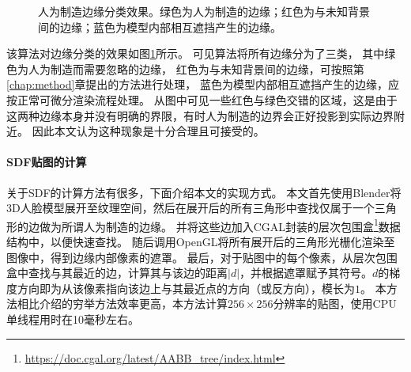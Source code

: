 \begin{figure}
\centering
{}
\caption[人为制造边缘分类效果]{人为制造边缘分类效果。绿色为人为制造的边缘；红色为与未知背景间的边缘；蓝色为模型内部相互遮挡产生的边缘。}
\label{fig:sdf_result}
\end{figure}

该算法对边缘分类的效果如图\ref{fig:sdf_result}所示。
可见算法将所有边缘分为了三类，
其中绿色为人为制造而需要忽略的边缘，
红色为与未知背景间的边缘，可按照第\ref{chap:method}章提出的方法进行处理，
蓝色为模型内部相互遮挡产生的边缘，应按正常可微分渲染流程处理。
从图中可见一些红色与绿色交错的区域，这是由于这两种边缘本身并没有明确的界限，有时人为制造的边界会正好投影到实际边界附近。
因此本文认为这种现象是十分合理且可接受的。

\paragraph{SDF贴图的计算}
关于SDF的计算方法有很多，下面介绍本文的实现方式。
本文首先使用Blender将3D人脸模型展开至纹理空间，然后在展开后的所有三角形中查找仅属于一个三角形的边做为所谓人为制造的边缘。
并将这些边加入CGAL封装的层次包围盒\footnote{\url{https://doc.cgal.org/latest/AABB_tree/index.html}}数据结构中，以便快速查找。
随后调用OpenGL将所有展开后的三角形光栅化渲染至图像中，得到边缘内部像素的遮罩。
最后，对于贴图中的每个像素，从层次包围盒中查找与其最近的边，计算其与该边的距离$|d|$，并根据遮罩赋予其符号。$d$的梯度方向即为从该像素指向该边上与其最近点的方向（或反方向），模长为$1$。
本方法相比\citet{green2007improved}介绍的穷举方法效率更高，本方法计算$256\times256$分辨率的贴图，使用CPU单线程用时在10毫秒左右。

